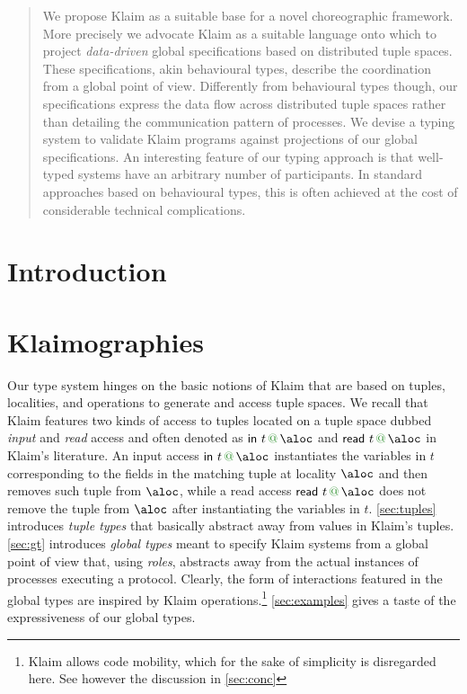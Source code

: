 \documentclass[runningheads,a4paper]{llncs}
\begin{document}
\begin{abstract}
  We propose Klaim as a suitable base for a novel choreographic
  framework.
  More precisely we advocate Klaim as a suitable language onto which
  to project \emph{data-driven} global specifications based on
  distributed tuple spaces.
  These specifications, akin behavioural types, describe the coordination
  from a global point of view.
  Differently from behavioural types though, our specifications
  express the data flow across distributed tuple spaces rather than
  detailing the communication pattern of processes.
  We devise a typing system to validate Klaim programs against projections
  of our global specifications.
  An interesting feature of our typing approach is that well-typed
  systems have an arbitrary number of participants.
  In standard approaches based on behavioural types, this is often
  achieved at the cost of considerable technical complications.
\end{abstract}



\section{Introduction}
\label{sec:intro}


\section{Klaimographies}
\label{sec:klaimographies}
Our type system hinges on the basic notions of Klaim that are based
on tuples, localities, and operations to generate and access tuple
spaces.
%
We recall that Klaim features two kinds of access to tuples located
on a tuple space dubbed \emph{input} and \emph{read} access and often
denoted as $\textsf{in}\ t \at \aloc$ and
$\textsf{read}\ t \at \aloc$ in Klaim's literature.
%
An input access $\textsf{in}\ t \at \aloc$ instantiates the
variables in $t$ corresponding to the fields in the matching
tuple at locality $\aloc$ and then removes such tuple from $\aloc$, while
a read access $\textsf{read}\ t \at \aloc$ does not remove the
tuple from $\aloc$ after instantiating the variables in $t$.
%
\cref{sec:tuples} introduces \emph{tuple types} that basically
abstract away from values in Klaim's tuples.
%
\cref{sec:gt} introduces \emph{global types} meant to specify
Klaim systems from a global point of view that, using \emph{roles},
abstracts away from the actual instances of processes executing a
protocol.
%
Clearly, the form of interactions featured in the global types are
inspired by Klaim operations.\footnote{Klaim allows code mobility, which for
  the sake of simplicity is disregarded here. See however the discussion in \cref{sec:conc}}
%
\cref{sec:examples} gives a taste of the expressiveness of our global
types.
\end{document}
